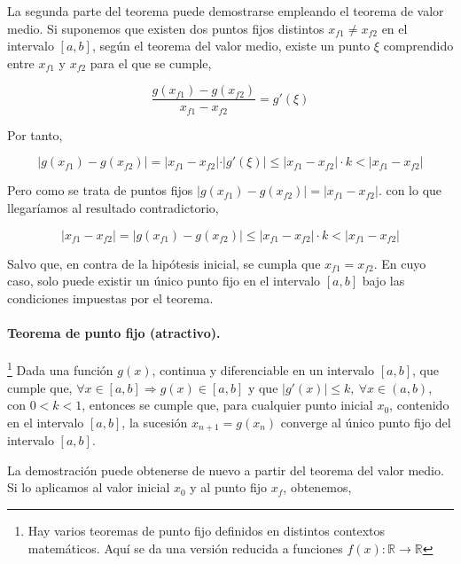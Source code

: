 La segunda parte del teorema puede demostrarse empleando el teorema de valor medio. Si suponemos  que existen dos puntos fijos distintos $x_{f1} \neq x_{f2}$ en el intervalo $[a,b]$, según el teorema del valor medio, existe un punto $\xi$ comprendido entre $x_{f1}$ y $ x_{f2}$ para el que se cumple,

\begin{equation*}
\frac{g(x_{f1})-g(x_{f2})}{x_{f1}-x_{f2}}=g'(\xi)
\end{equation*}

Por tanto,

\begin{equation*}
\vert g(x_{f1})-g(x_{f2}) \vert =\vert x_{f1}-x_{f2} \vert\cdot \vert g'(\xi) \vert \leq \vert x_{f1}-x_{f2} \vert \cdot k < \vert x_{f1}-x_{f2} \vert 
\end{equation*}

Pero como se trata de puntos fijos $\vert g(x_{f1})-g(x_{f2}) \vert =\vert x_{f1}-x_{f2}\vert $. con lo que llegaríamos al resultado contradictorio, 

 \begin{equation*}
\vert x_{f1}-x_{f2}\vert=\vert g(x_{f1})-g(x_{f2}) \vert  \leq \vert x_{f1}-x_{f2} \vert\cdot k < \vert x_{f1}-x_{f2} \vert 
\end{equation*}

Salvo que, en contra de la hipótesis inicial, se cumpla que  $ x_{f1}=x_{f2}$. En cuyo caso, solo puede existir un único punto fijo en el intervalo $[a, b]$ bajo las condiciones impuestas por el teorema.

\paragraph{Teorema de punto fijo (atractivo).} \footnote{Hay varios teoremas de punto fijo definidos en distintos contextos matemáticos. Aquí se da una versión reducida a funciones $f(x):\mathbb{R} \rightarrow \mathbb{R}$} Dada una función $g(x)$,  continua y diferenciable en un intervalo $[a, b]$, que  cumple que, $\forall x \in [a, b] \Rightarrow g(x)\in [a,b]$ y que  $\vert g'(x) \vert \leq k, \  \forall x \in (a, b)$, con $0<k<1$, entonces se cumple que, para cualquier punto inicial $x_0$, contenido en el intervalo $[a, b]$, la sucesión  $x_{n+1}=g(x_n)$ converge al único punto fijo del intervalo $[a, b]$.

La demostración puede obtenerse de nuevo a partir del teorema del valor medio.  Si lo aplicamos al valor inicial $x_0$ y al punto fijo $x_f$, obtenemos,

